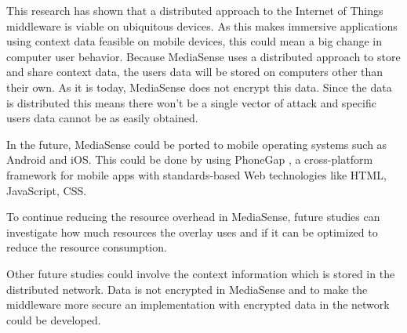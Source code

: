 This research has shown that a distributed approach to the Internet of Things middleware is viable on ubiquitous devices. As this makes immersive applications using context data feasible on mobile devices, this could mean a big change in computer user behavior.
Because MediaSense uses a distributed approach to store and share context data, the users data will be stored on computers other than their own. As it is today, MediaSense does not encrypt this data. Since the data is distributed this means there won't be a single vector of attack and specific users data cannot be as easily obtained. 

In the future, MediaSense could be ported to mobile operating systems such as Android and iOS. This could be done by using PhoneGap \cite{phonegap}, a cross-platform framework for mobile apps with standards-based Web technologies like HTML, JavaScript, CSS. 

To continue reducing the resource overhead in MediaSense, future studies can investigate how much resources the overlay uses and if it can be optimized to reduce the resource consumption. 

Other future studies could involve the context information which is stored in the distributed network. Data is not encrypted in MediaSense and to make the middleware more secure an implementation with encrypted data in the network could be developed.
